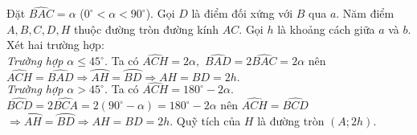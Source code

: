 \begin{bt}
{\begin{center}
\begin{multicols}{2}
			\end{multicols}
		\end{center}
		Đặt $\widehat{BAC}=\alpha$ ($0^{\circ}<\alpha<90^{\circ}$). Gọi $D$ là điểm đối xứng với $B$ qua $a$. Năm điểm $A,B,C,D,H$ thuộc đường tròn đường kính $AC$. Gọi $h$ là khoảng cách giữa $a$ và $b$. Xét hai trường hợp:\\
		\textit{Trường hợp $\alpha\leq 45^{\circ}$.} Ta có $\widehat{ACH}=2\alpha,$ $\widehat{BAD}=2\widehat{BAC}=2\alpha$ nên $\widehat{ACH}=\widehat{BAD}\Rightarrow \wideparen{AH}=\wideparen{BD} \Rightarrow AH=BD=2h.$\\
		\textit{Trường hợp $\alpha> 45^{\circ}$.}  Ta có $\widehat{ACH}=180^{\circ}-2\alpha.$\\
		$\widehat{BCD}=2\widehat{BCA}=2(90^{\circ}-\alpha)=180^{\circ}-2\alpha$ nên $\widehat{ACH}=\widehat{BCD}$ $\Rightarrow \wideparen{AH}=\wideparen{BD} \Rightarrow AH=BD=2h.$ Quỹ tích của $H$ là đường tròn $(A;2h).$
	}
\end{bt}
